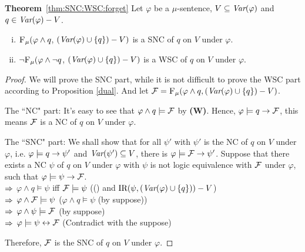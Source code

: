 \documentclass[runningheads]{llncs}
\begin{document}
\noindent\textbf{Theorem}~\ref{thm:SNC:WSC:forget} Let $\varphi$ be a $\mu$-sentence, $V\subseteq\textit{Var}(\varphi)$ and $q\in\textit{Var}(\varphi)- V$.
 \begin{enumerate}[(i)]
   \item ${\textsc{F}_{\textsc{$\mu$}}}(\varphi \land q$, $(\textit{Var}(\varphi) \cup \{q\}) - V)$
   is a SNC of $q$ on $V$ under $\varphi$.
   \item  $\neg{\textsc{F}_{\textsc{$\mu$}}} (\varphi \land \neg q$, $(\textit{Var}(\varphi) \cup \{q\}) - V)$
   is a WSC of $q$ on $V$ under $\varphi$.
 \end{enumerate}
\begin{proof}
  We will prove the SNC part, while it is not difficult to prove the WSC part according to Proposition \ref{dual}. And let ${\cal F}={\textsc{F}_{\textsc{$\mu$}}}(\varphi \wedge q, (\textit{Var}(\varphi) \cup \{q\})- V)$.

    The ``NC" part: It's easy to see that $\varphi \wedge q \models {\cal F}$ by {\bfseries (W)}. Hence, $\varphi\models q \rightarrow {\cal F}$, this means
  ${\cal F}$ is a NC of $q$ on $V$ under $\varphi$.

  The ``SNC" part: We shall show that for all $\psi'$ with $\psi'$ is the NC of $q$ on $V$ under $\varphi$, i.e. $\varphi \models q \rightarrow \psi'$ and $\textit{Var}(\psi') \subseteq V$, there is $\varphi \models {\cal F} \rightarrow \psi'$. Suppose that there exists a NC $\psi$ of $q$ on $V$ under $\varphi$ with $\psi$ is not logic equivalence with ${\cal F}$ under $\varphi$, such that $\varphi \models \psi \rightarrow {\cal F}$.\\
  $\Rightarrow$ $\varphi \wedge q \models \psi$ iff ${\cal F} \models \psi$ \hfill ((\PP) and $\textrm{IR}(\psi, (\textit{Var}(\varphi)\cup \{q\})) -V$)\\
  $\Rightarrow$ $\varphi \wedge {\cal F} \models \psi$  \hfill ($\varphi \wedge q \models \psi$ (by suppose))\\
  $\Rightarrow$ $\varphi \wedge \psi \models {\cal F}$  \hfill (by suppose)\\
  $\Rightarrow$ $\varphi \models \psi \leftrightarrow {\cal F}$  \hfill (Contradict with the suppose)

  Therefore, ${\cal F}$ is the SNC of $q$ on $V$ under $\varphi$.
 \end{proof}
\end{document}
